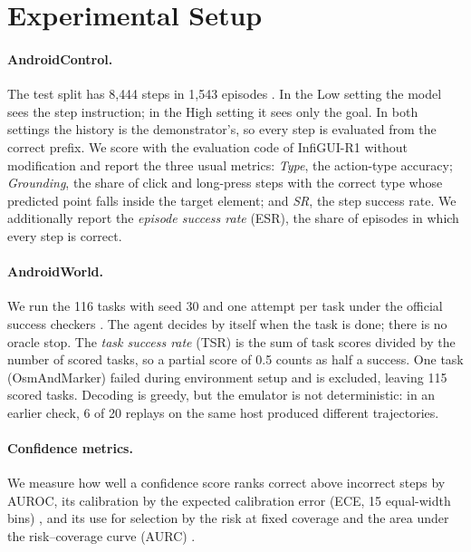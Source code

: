 \documentclass{article}
\begin{document}
\section{Experimental Setup}
\label{sec:setup}

\paragraph{AndroidControl.}
The test split has 8{,}444 steps in 1{,}543 episodes \citep{androidcontrol2024}. In the Low setting the model
sees the step instruction; in the High setting it sees only the goal. In both settings the history is the
demonstrator's, so every step is evaluated from the correct prefix. We score with the evaluation code of
InfiGUI-R1 \citep{infiguir1} without modification and report the three usual metrics: \emph{Type}, the
action-type accuracy; \emph{Grounding}, the share of click and long-press steps with the correct type whose
predicted point falls inside the target element; and \emph{SR}, the step success rate. We additionally report
the \emph{episode success rate} (ESR), the share of episodes in which every step is correct.

\paragraph{AndroidWorld.}
We run the 116 tasks with seed 30 and one attempt per task under the official success checkers
\citep{androidworld2024}. The agent decides by itself when the task is done; there is no oracle stop. The
\emph{task success rate} (TSR) is the sum of task scores divided by the number of scored tasks, so a partial
score of 0.5 counts as half a success. One task (OsmAndMarker) failed during environment setup and is excluded,
leaving 115 scored tasks. Decoding is greedy, but the emulator is not deterministic: in an earlier check, 6 of 20
replays on the same host produced different trajectories.

\paragraph{Confidence metrics.}
We measure how well a confidence score ranks correct above incorrect steps by AUROC, its calibration by the
expected calibration error (ECE, 15 equal-width bins) \citep{guo2017calibration}, and its use for selection by
the risk at fixed coverage and the area under the risk--coverage curve (AURC) \citep{geifman2017selective}.
\end{document}
